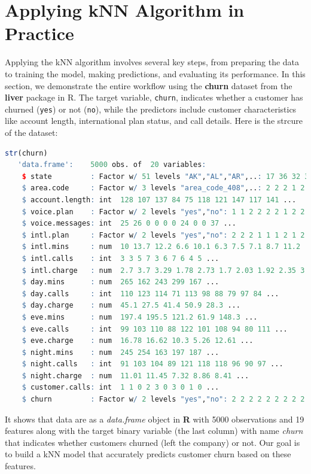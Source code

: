 \documentclass[
]{book}
\newcommand{\passthrough}[1]{#1}
\theoremstyle{definition}
\theoremstyle{definition}
\theoremstyle{definition}
\theoremstyle{definition}
\theoremstyle{remark}
\begin{document}
\section{Applying kNN Algorithm in Practice}\label{sec-kNN-churn}

Applying the kNN algorithm involves several key steps, from preparing the data to training the model, making predictions, and evaluating its performance. In this section, we demonstrate the entire workflow using the \textbf{churn} dataset from the \textbf{liver} package in R. The target variable, \passthrough{\lstinline!churn!}, indicates whether a customer has churned (\passthrough{\lstinline!yes!}) or not (\passthrough{\lstinline!no!}), while the predictors include customer characteristics like account length, international plan status, and call details. Here is the strcure of the dataset:

\begin{lstlisting}[language=R]
str(churn)
   'data.frame':    5000 obs. of  20 variables:
    $ state         : Factor w/ 51 levels "AK","AL","AR",..: 17 36 32 36 37 2 20 25 19 50 ...
    $ area.code     : Factor w/ 3 levels "area_code_408",..: 2 2 2 1 2 3 3 2 1 2 ...
    $ account.length: int  128 107 137 84 75 118 121 147 117 141 ...
    $ voice.plan    : Factor w/ 2 levels "yes","no": 1 1 2 2 2 2 1 2 2 1 ...
    $ voice.messages: int  25 26 0 0 0 0 24 0 0 37 ...
    $ intl.plan     : Factor w/ 2 levels "yes","no": 2 2 2 1 1 1 2 1 2 1 ...
    $ intl.mins     : num  10 13.7 12.2 6.6 10.1 6.3 7.5 7.1 8.7 11.2 ...
    $ intl.calls    : int  3 3 5 7 3 6 7 6 4 5 ...
    $ intl.charge   : num  2.7 3.7 3.29 1.78 2.73 1.7 2.03 1.92 2.35 3.02 ...
    $ day.mins      : num  265 162 243 299 167 ...
    $ day.calls     : int  110 123 114 71 113 98 88 79 97 84 ...
    $ day.charge    : num  45.1 27.5 41.4 50.9 28.3 ...
    $ eve.mins      : num  197.4 195.5 121.2 61.9 148.3 ...
    $ eve.calls     : int  99 103 110 88 122 101 108 94 80 111 ...
    $ eve.charge    : num  16.78 16.62 10.3 5.26 12.61 ...
    $ night.mins    : num  245 254 163 197 187 ...
    $ night.calls   : int  91 103 104 89 121 118 118 96 90 97 ...
    $ night.charge  : num  11.01 11.45 7.32 8.86 8.41 ...
    $ customer.calls: int  1 1 0 2 3 0 3 0 1 0 ...
    $ churn         : Factor w/ 2 levels "yes","no": 2 2 2 2 2 2 2 2 2 2 ...
\end{lstlisting}

It shows that data are as a \emph{data.frame} object in \textbf{R} with 5000 observations and 19 features along with the target binary variable (the last column) with name \emph{churn} that indicates whether customers churned (left the company) or not. Our goal is to build a kNN model that accurately predicts customer churn based on these features.
\end{document}
